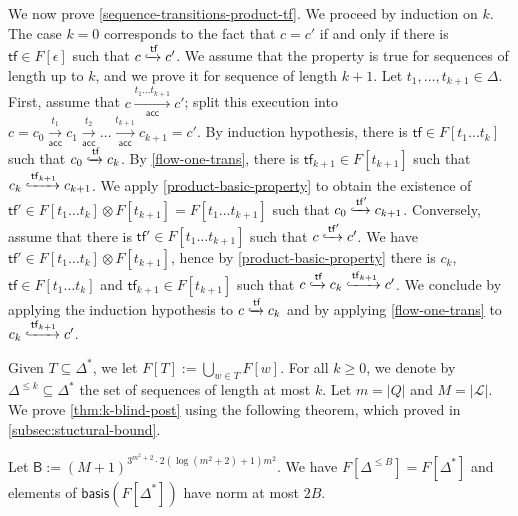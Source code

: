 \documentclass[10pt,a4paper]{article}
\renewcommand{\geq}{\geqslant}
\renewcommand{\leq}{\leqslant}
\newcommand{\deff}{:=}
\newcommand{\size}[1]{|#1|}
\newcommand{\transitions}{\Delta}
\newcommand*{\states}{Q}
\newcommand*{\atrans}{t}
\newcommand{\bstates}{\mathcal{L}}
\newcommand{\prodconfig}{c}
\newcommand{\accstep}[1]{\xrightarrow[\mathsf{acc}]{#1}}
\newcommand{\structuralbound}{\mathsf{B}}
\newcommand*{\minwqo}[1]{\mathsf{basis}(#1)}
\newcommand*{\transfersof}[1]{F[#1]}
\newcommand*{\atf}{\mathsf{tf}}
\newcommand*{\tftimes}{\otimes}
\newcommand*{\flowstep}[1]{\xhookrightarrow{#1}}
\newcommand*{\emptysequence}{\epsilon}
\begin{document}
\begin{appendixproof}
	We now prove \cref{sequence-transitions-product-tf}.
	We proceed by induction on \(k\).
	The case \(k=0\) corresponds to the fact that \(\prodconfig = \prodconfig'\) if and only if there is \(\atf \in \transfersof{\emptysequence}\) such that \(\prodconfig \flowstep{\atf} \prodconfig'\).
	We assume that the property is true for sequences of length up to \(k\), and we prove it for sequence of length \(k+1\).
	Let \(\atrans_1, \dots, \atrans_{k+1} \in \transitions\).
	First, assume that \(\prodconfig \accstep{\atrans_1 \dots \atrans_{k+1}} \prodconfig'\); split this execution into \(\prodconfig = \prodconfig_0 \accstep{\atrans_1} \prodconfig_1 \accstep{\atrans_2} \dots \accstep{\atrans_{k+1}} \prodconfig_{k+1} = \prodconfig'\).
	By induction hypothesis, there is \(\atf \in \transfersof{\atrans_1 \dots \atrans_k}\) such that \(\prodconfig_0 \flowstep{\atf} \prodconfig_k\).
	By \cref{flow-one-trans}, there is \(\atf_{k+1} \in \transfersof{\atrans_{k+1}}\) such that \(\prodconfig_k \flowstep{\atf_{k+1}} \prodconfig_{k+1}\).
	We apply \cref{product-basic-property} to obtain the existence of \(\atf' \in \transfersof{\atrans_1 \dots \atrans_k} \tftimes \transfersof{\atrans_{k+1}} = \transfersof{\atrans_1 \dots \atrans_{k+1}}\) such that \(\prodconfig_0 \flowstep{\atf'} \prodconfig_{k+1}\).
	Conversely, assume that there is \(\atf' \in \transfersof{\atrans_1 \dots \atrans_{k+1}}\) such that \(\prodconfig \flowstep{\atf'} \prodconfig'\).
	We have \(\atf' \in \transfersof{\atrans_1 \dots \atrans_k} \tftimes \transfersof{\atrans_{k+1}}\), hence by \cref{product-basic-property} there is \(\prodconfig_k\), \(\atf \in \transfersof{\atrans_1 \dots \atrans_k}\) and \(\atf_{k+1} \in \transfersof{\atrans_{k+1}}\) such that \(\prodconfig \flowstep{\atf} \prodconfig_k \flowstep{\atf_{k+1}} \prodconfig'\).
	We conclude by applying the induction hypothesis to \(\prodconfig \flowstep{\atf} \prodconfig_k\) and by applying \cref{flow-one-trans} to \(\prodconfig_k \flowstep{\atf_{k+1}} \prodconfig'\).
\end{appendixproof}

Given \(T \subseteq \transitions^*\), we let \(\transfersof{T} \deff \bigcup_{w \in T} \transfersof{w}\).
For all \(k \geq 0\), we denote by \(\transitions^{\leq k} \subseteq \transitions^*\) the set of sequences of length at most \(k\).
Let \(m = \size{\states}\) and \(M = \size{\bstates}\).
We prove \cref{thm:k-blind-post} using the following theorem, which proved in \cref{subsec:stuctural-bound}.

\begin{theorem}
	\label{structural-theorem-flows}
	Let \(\structuralbound \deff (M+1)^{3^{m^2+2} \cdot 2(\log(m^2+2) +1) m^2}\).
	We have \(\transfersof{\transitions^{\leq B}} = \transfersof{\transitions^*}\) and elements of \(\minwqo{\transfersof{\transitions^*}}\) have norm at most \(2B\).
\end{theorem}
%
\end{document}
